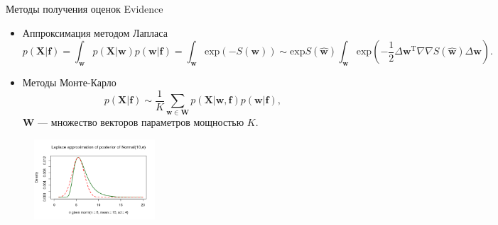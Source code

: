 \documentclass[10pt,pdf,utf8,russian,aspectratio=169]{beamer}
\begin{document}
\begin{frame}{Методы получения оценок Evidence}
\begin{itemize}
\item{Аппроксимация методом Лапласа}\\
$$
	p(\mathbf{X}|\mathbf{f}) = \int_\mathbf{w} p(\mathbf{X}|\mathbf{w}) p(\mathbf{w}|\mathbf{f}) = \int_\mathbf{w} \text{exp}(-S(\mathbf{w}))	\sim  \text{exp}S(\hat{\mathbf{w}}) \int_\mathbf{w} \text{exp} (-\frac{1}{2}\Delta \mathbf{w}^\text{T} \nabla \nabla S(\hat{\mathbf{w}}) \Delta \mathbf{w} ).
$$

\item {Методы Монте-Карло}
$$
p(\mathbf{X}|\mathbf{f})  \sim \frac{1}{K}\sum_{\mathbf{w} \in \mathbf{W}} p(\mathbf{X}|\mathbf{w},\mathbf{f})p(\mathbf{w}|\mathbf{f}),
$$
$\mathbf{W}$ --- множество векторов параметров мощностью $K$.
\end{itemize}
\begin{figure}
  \centering
 \includegraphics[width=0.4\textwidth]{laplace2.png}
\label{fig:1}\qquad	
\end{figure}
\end{frame}
\end{document}
